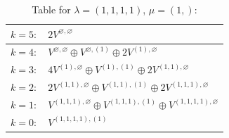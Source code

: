 \documentclass[a4paper,12pt]{article}
\begin{document}
\renewcommand{\arraystretch}{1.6} 
\begin{table}[H]
\centering
\caption{Table for $\lambda = (1, 1, 1, 1)$, $\mu = (1,)$:}
\begin{tabular}{|>{\centering\arraybackslash}p{15cm}|}
\hline
 $k = 5: \quad 2 V^{\varnothing, \varnothing} $ \\ \hline
 $k = 4: \quad V^{\varnothing, \varnothing} \oplus V^{\varnothing, (1)} \oplus 2 V^{(1), \varnothing} $ \\ \hline
 $k = 3: \quad 4 V^{(1), \varnothing} \oplus V^{(1), (1)} \oplus 2 V^{(1, 1), \varnothing} $ \\ \hline
 $k = 2: \quad 2 V^{(1, 1), \varnothing} \oplus V^{(1, 1), (1)} \oplus 2 V^{(1, 1, 1), \varnothing} $ \\ \hline
 $k = 1: \quad V^{(1, 1, 1), \varnothing} \oplus V^{(1, 1, 1), (1)} \oplus V^{(1, 1, 1, 1), \varnothing} $ \\ \hline
 $k = 0: \quad V^{(1, 1, 1, 1), (1)} $ \\ \hline
\end{tabular}
\end{table}



\end{document}
